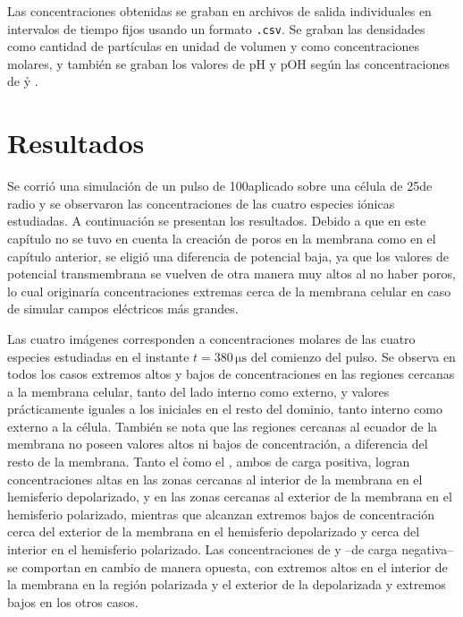 Las concentraciones obtenidas se graban en archivos de salida individuales en intervalos de tiempo fijos usando un formato \texttt{.csv}. Se graban las densidades como cantidad de partículas en unidad de volumen y como concentraciones molares, y también se graban los valores de pH y pOH según las concentraciones de \h y \oh. 


\section{Resultados}

Se corrió una simulación de un pulso de 100\vcm aplicado sobre una célula de 25\um de radio y se observaron las concentraciones de las cuatro especies iónicas estudiadas. A continuación se presentan los resultados. Debido a que en este capítulo no se tuvo en cuenta la creación de poros en la membrana como en el capítulo anterior, se eligió una diferencia de potencial baja, ya que los valores de potencial transmembrana se vuelven de otra manera muy altos al no haber poros, lo cual originaría concentraciones extremas cerca de la membrana celular en caso de simular campos eléctricos más grandes.



Las cuatro imágenes corresponden a concentraciones molares de las cuatro especies estudiadas en el instante $t = 380 \, \si{\micro\second}$ del comienzo del pulso. Se observa en todos los casos extremos altos y bajos de concentraciones en las regiones cercanas a la membrana celular, tanto del lado interno como externo, y valores prácticamente iguales a los iniciales en el resto del dominio, tanto interno como externo a la célula. También se nota que las regiones cercanas al ecuador de la membrana no poseen valores altos ni bajos de concentración, a diferencia del resto de la membrana. Tanto el \h como el \na, ambos de carga positiva, logran concentraciones altas en las zonas cercanas al interior de la membrana en el hemisferio depolarizado, y en las zonas cercanas al exterior de la membrana en el hemisferio polarizado, mientras que alcanzan extremos bajos de concentración cerca del exterior de la membrana en el hemisferio depolarizado y cerca del interior en el hemisferio polarizado. Las concentraciones de \oh y \cl --de carga negativa-- se comportan en cambio de manera opuesta, con extremos altos en el interior de la membrana en la región polarizada y el exterior de la depolarizada y extremos bajos en los otros casos. 

